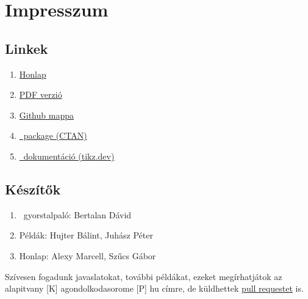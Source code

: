 \chapter{Impresszum}

\section{Linkek}
\begin{enumerate}
    \item[] \href{./index.html}{Honlap}
    \item[] \href{./mainpage.pdf}{PDF verzió}
    \item[] \href{https://github.com/a-gondolkodas-orome/tikz-tutorial}{Github mappa} 
    \item[] \href{https://ctan.ijs.si/tex-archive/graphics/pgf/base/doc/pgfmanual.pdf}{\tikzname\ package (CTAN)} 
    \item[] \href{https://tikz.dev/}{\tikzname\ dokumentáció (tikz.dev)} 
\end{enumerate}
        
\section{Készítők}
\begin{enumerate}
    \item[] \tikzname\ gyorstalpaló: Bertalan Dávid
    \item[] Példák: Hujter Bálint, Juhász Péter
    \item[] Honlap: Alexy Marcell, Szűcs Gábor
\end{enumerate}

Szívesen fogadunk javaslatokat, további példákat, ezeket megírhatjátok az alapitvany [K] agondolkodasorome [P] hu címre, de küldhettek \href{https://github.com/a-gondolkodas-orome/tikz-tutorial/pulls}{pull requestet} is. 
